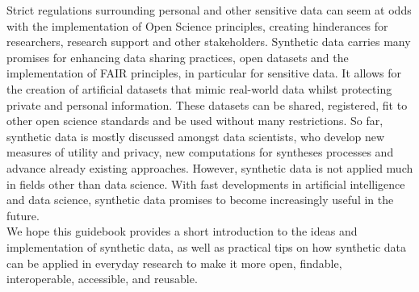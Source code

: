 
\label{conclusion}

Strict regulations surrounding personal and other sensitive data can seem at odds with the implementation of Open Science principles, creating hinderances for researchers, research support and other stakeholders. Synthetic data carries many promises for enhancing data sharing practices, open datasets and the implementation of FAIR principles, in particular for sensitive data. It allows for the creation of artificial datasets that mimic real-world data whilst protecting private and personal information. These datasets can be shared, registered, fit to other open science standards and be used without many restrictions. So far, synthetic data is mostly discussed amongst data scientists, who develop new measures of utility and privacy, new computations for syntheses processes and advance already existing approaches. However, synthetic data is not applied much in fields other than data science. With fast developments in artificial intelligence and data science, synthetic data promises to become increasingly useful in the future.  \\

We hope this guidebook provides a short introduction to the ideas and implementation of synthetic data, as well as practical tips on how synthetic data can be applied in everyday research to make it more open, findable, interoperable, accessible, and reusable.  


